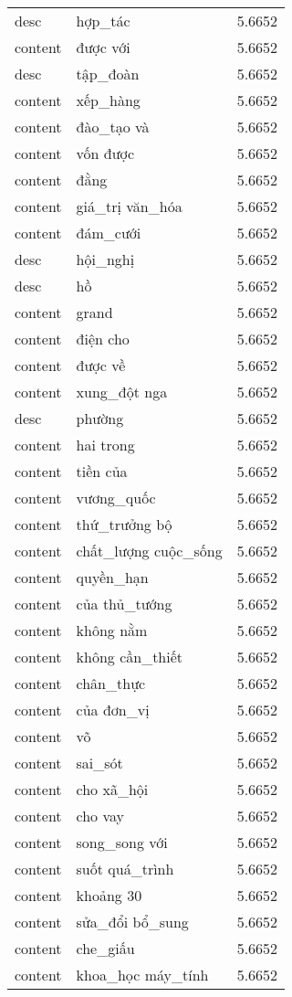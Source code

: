 \documentclass{article}
\begin{document}
\begin{tabular}{lll}
desc & hợp\_tác & 5.6652\\
content & được với & 5.6652\\
desc & tập\_đoàn & 5.6652\\
content & xếp\_hàng & 5.6652\\
content & đào\_tạo và & 5.6652\\
content & vốn được & 5.6652\\
content & đằng & 5.6652\\
content & giá\_trị văn\_hóa & 5.6652\\
content & đám\_cưới & 5.6652\\
desc & hội\_nghị & 5.6652\\
desc & hồ & 5.6652\\
content & grand & 5.6652\\
content & điện cho & 5.6652\\
content & được về & 5.6652\\
content & xung\_đột nga & 5.6652\\
desc & phường & 5.6652\\
content & hai trong & 5.6652\\
content & tiền của & 5.6652\\
content & vương\_quốc & 5.6652\\
content & thứ\_trưởng bộ & 5.6652\\
content & chất\_lượng cuộc\_sống & 5.6652\\
content & quyền\_hạn & 5.6652\\
content & của thủ\_tướng & 5.6652\\
content & không nằm & 5.6652\\
content & không cần\_thiết & 5.6652\\
content & chân\_thực & 5.6652\\
content & của đơn\_vị & 5.6652\\
content & võ & 5.6652\\
content & sai\_sót & 5.6652\\
content & cho xã\_hội & 5.6652\\
content & cho vay & 5.6652\\
content & song\_song với & 5.6652\\
content & suốt quá\_trình & 5.6652\\
content & khoảng 30 & 5.6652\\
content & sửa\_đổi bổ\_sung & 5.6652\\
content & che\_giấu & 5.6652\\
content & khoa\_học máy\_tính & 5.6652\\

\end{tabular}
\end{document}

